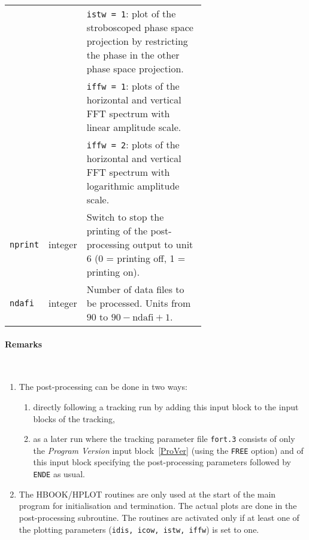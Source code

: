 \begin{longtabu}{@{}llp{0.65\linewidth}}
                          &          & \texttt{istw = 1}: plot of the stroboscoped phase space projection by restricting the phase in the other phase space projection. \\
                          &          & \texttt{iffw = 1}: plots of the horizontal and vertical FFT spectrum with linear amplitude scale. \\
                          &          & \texttt{iffw = 2}: plots of the horizontal and vertical FFT spectrum with logarithmic amplitude scale. \\
    \texttt{nprint}       & integer  & Switch to stop the printing of the post-processing output to unit 6 (0 = printing off, 1 = printing on). \\
    \texttt{ndafi}        & integer  & Number of data files to be processed. Units from $90$ to $90 - \mbox{ndafi} + 1$.
\end{longtabu}

\paragraph{Remarks}~
\begin{enumerate}
    \item The post-processing can be done in two ways:
    \begin{enumerate}
        \item directly following a tracking run by adding this input block to the input blocks of the tracking,
        \item as a later run where the tracking parameter file \texttt{fort.3} consists of only the \textit{Program Version} input   block~\ref{ProVer} (using the \texttt{FREE} option) and of this input block specifying the post-processing parameters followed by \texttt{ENDE} as usual.
    \end{enumerate}
    \item The HBOOK/HPLOT routines are only used at the start of the main program for initialisation and termination. The actual plots are done in the post-processing subroutine. The routines are activated only if at least one of the plotting parameters (\texttt{idis, icow, istw, iffw}) is set to one.
\end{enumerate}

